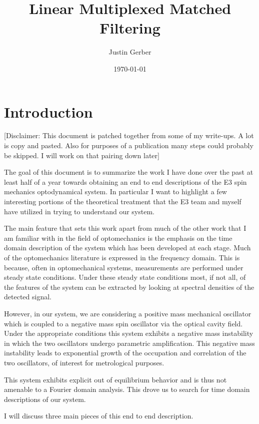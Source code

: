 \documentclass[12pt]{article}
\begin{document}
\title{Linear Multiplexed Matched Filtering}
\author{Justin Gerber}
\date{\today}
\maketitle

\section{Introduction}

[Disclaimer: This document is patched together from some of my write-ups. A lot is copy and pasted. Also for purposes of a publication many steps could probably be skipped. I will work on that pairing down later]

The goal of this document is to summarize the work I have done over the past at least half of a year towards obtaining an end to end descriptions of the E3 spin mechanics optodynamical system. In particular I want to highlight a few interesting portions of the theoretical treatment that the E3 team and myself have utilized in trying to understand our system.

The main feature that sets this work apart from much of the other work that I am familiar with in the field of optomechanics is the emphasis on the time domain description of the system which has been developed at each stage. Much of the optomechanics literature is expressed in the frequency domain. This is because, often in optomechanical systems, measurements are performed under steady state conditions. Under these steady state conditions most, if not all, of the features of the system can be extracted by looking at spectral densities of the  detected signal.

However, in our system, we are considering a positive mass mechanical oscillator which is coupled to a negative mass spin oscillator via the optical cavity field. Under the appropriate conditions this system exhibits a negative mass instability in which the two oscillators undergo parametric amplification. This negative mass instability leads to exponential growth of the occupation and correlation of the two oscillators, of interest for metrological purposes.

This system exhibits explicit out of equilibrium behavior and is thus not amenable to a Fourier domain analysis. This drove us to search for time domain descriptions of our system.

I will discuss three main pieces of this end to end description. 
\end{document}

